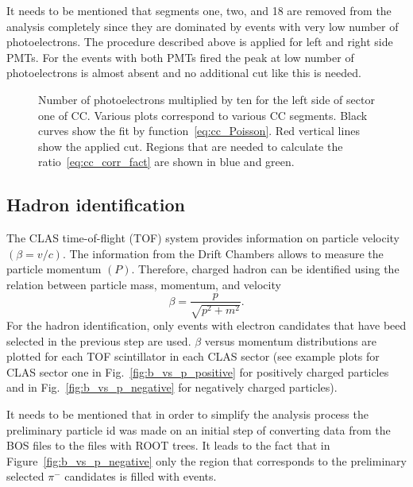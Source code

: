 It needs to be mentioned that segments one, two, and 18 are removed from the analysis completely since they are dominated by events with very low number of photoelectrons. The procedure described above is applied for left and right side PMTs. For the events with both PMTs fired the peak at low number of photoelectrons is almost absent and no additional cut like this is needed.



\begin{figure}[htp]
\begin{center}
\caption{\small  Number of photoelectrons multiplied by ten for the left side of sector one of CC. Various plots correspond to various CC segments. Black curves show the fit by function~\ref{eq:cc_Poisson}. Red vertical lines show the applied cut. Regions that are needed to calculate the ratio~\ref{eq:cc_corr_fact} are shown in blue and green.} \label{fig:nphe_cut}
\end{center}
\end{figure}





\subsection{Hadron identification}
\label{hadron}

The CLAS time-of-flight (TOF) system provides information on particle
velocity $(\beta= v/c)$.  The information from the Drift
Chambers allows to measure the particle momentum $(P)$. Therefore,
charged hadron can be identified using the relation between particle
mass, momentum, and velocity
\begin{equation}
\beta=\frac{p}{\sqrt{p^{2}+m^{2}}}.
\label{eq:hadron_hadronmass}
\end{equation}
For the hadron identification, only events with electron candidates that have beed selected in the previous step are used.
$\beta$ versus momentum distributions are plotted for each TOF scintillator in each CLAS sector (see example plots for CLAS sector one in Fig.~\ref{fig:b_vs_p_positive} for positively charged particles and in Fig.~\ref{fig:b_vs_p_negative} for negatively charged particles). 

It needs to be mentioned that in order to simplify the analysis process the preliminary particle id was made on an initial step of converting data from the BOS files to the files with ROOT trees. It leads to the fact that in 
Figure~\ref{fig:b_vs_p_negative} only the region that corresponds to the preliminary selected $\pi^{-}$ candidates is filled with events.

